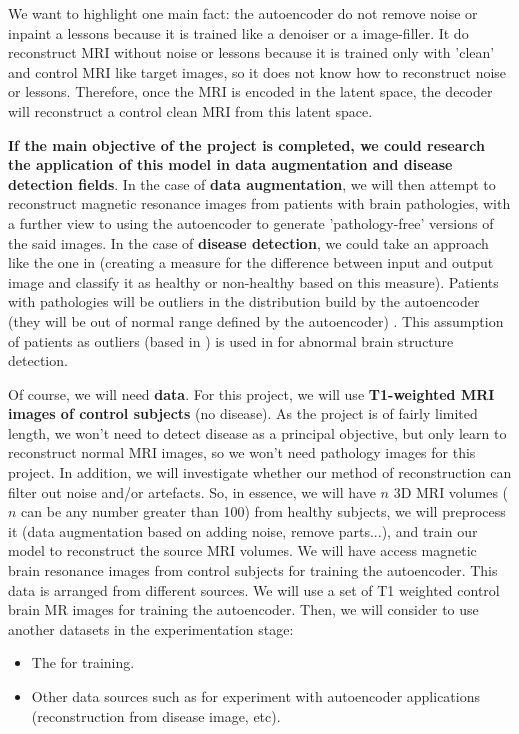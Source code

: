 We want to highlight one main fact: the autoencoder do not remove noise or inpaint a lessons because it is trained like a denoiser or a image-filler. It do reconstruct MRI without noise or lessons because it is trained only with 'clean' and control MRI like target images, so it does not know how to reconstruct noise or lessons. Therefore, once the MRI is encoded in the latent space, the decoder will reconstruct a control clean MRI from this latent space.

\textbf{If the main objective of the project is completed, we could research the application of this model in data augmentation and disease detection fields}. In the case of \textbf{data augmentation}, we will then attempt to reconstruct magnetic resonance images from patients with brain pathologies, with a further view to using the autoencoder to generate 'pathology-free' versions of the said images. In the case of \textbf{disease detection}, we could take an approach like the one in \cite{pinaya2019} (creating a measure for the difference between input and output image and classify it as healthy or non-healthy based on this measure). Patients with pathologies will be outliers in the distribution build by the autoencoder (they will be out of normal range defined by the autoencoder) \cite{marquand2016normative} \cite{mourao2011outlier}. This assumption of patients as outliers (based in \cite{mourao2011outlier}) is used in \cite{pinaya2019} for abnormal brain structure detection.

Of course, we will need \textbf{data}. For this project, we will use \textbf{T1-weighted MRI images of control subjects} (no disease). As the project is of fairly limited length, we won't need to detect disease as a principal objective, but only learn to reconstruct normal MRI images, so we won't need pathology images for this project. In addition, we will investigate whether our method of reconstruction can filter out noise and/or artefacts. So, in essence, we will have $n$ 3D MRI volumes ($n$ can be any number greater than 100) from healthy subjects, we will preprocess it (data augmentation based on adding noise, remove parts...), and train our model to reconstruct the source MRI volumes. We will have access magnetic brain resonance images from control subjects for training the autoencoder. This data is arranged from different sources. We will use a set of T1 weighted control brain MR images for training the autoencoder. Then, we will consider to use another datasets in the experimentation stage:

\begin{itemize}
    \item The  for training.
    \item Other data sources such as  for experiment with autoencoder applications (reconstruction from disease image, etc).
\end{itemize}



